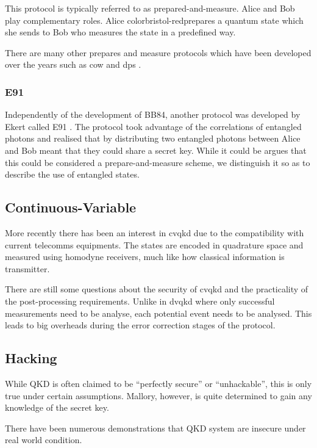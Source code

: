 This protocol is typically referred to as {\color{bristol-red}prepared-and-measure}. Alice and Bob play complementary roles. Alice {color{bristol-red}prepares} a quantum state which she sends to Bob who {\color{bristol-red}measures} the state in a predefined way. 

There are many other prepares and measure protocols which have been developed over the years such as \ac{cow} \cite{COW-QKD} and \ac{dps} \cite{DPS-QKD}.

\subsubsection*{E91}

Independently of the development of BB84, another protocol was developed by Ekert called E91 \cite{E91}. The protocol took advantage of the correlations of entangled photons and realised that by distributing two entangled photons between Alice and Bob meant that they could share a secret key. While it could be argues that this could be considered a prepare-and-measure scheme, we distinguish it so as to describe the use of entangled states.

\subsection{Continuous-Variable}

More recently there has been an interest in \ac{cvqkd} due to the compatibility with current telecomms equipments. The states are encoded in quadrature space and measured using homodyne receivers, much like how classical information is transmitter.

There are still some questions about the security of \ac{cvqkd} and the practicality of the post-processing requirements. Unlike in \ac{dvqkd} where only successful measurements need to be analyse, each potential event needs to be analysed. This leads to big overheads during the error correction stages of the protocol.

\subsection{Hacking}

While \ac{QKD} is often claimed to be ``perfectly secure'' or ``unhackable'', this is only true under certain assumptions.  Mallory, however, is quite determined to gain any knowledge of the secret key. 

There have been numerous demonstrations that \ac{QKD} system are insecure under real world condition.

